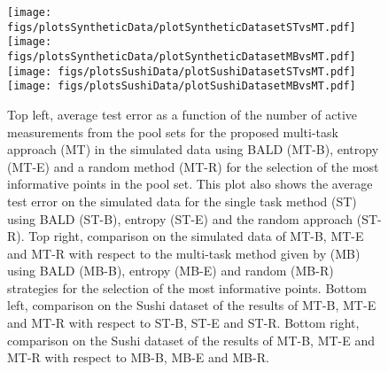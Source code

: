\begin{figure}
\begin{center}
\texttt{[image: figs/plotsSyntheticData/plotSyntheticDatasetSTvsMT.pdf]}
\hspace{0.5cm}
\texttt{[image: figs/plotsSyntheticData/plotSyntheticDatasetMBvsMT.pdf]}\\
\vspace{0.5cm}
\texttt{[image: figs/plotsSushiData/plotSushiDatasetSTvsMT.pdf]}
\hspace{0.5cm}
\texttt{[image: figs/plotsSushiData/plotSushiDatasetMBvsMT.pdf]}
\caption{Top left, average test error as a function of the number of active measurements from the pool sets
for the proposed multi-task approach (MT) in the simulated data using BALD (MT-B), entropy (MT-E) and a random method (MT-R)
for the selection of the most informative points in the pool set. This plot also shows the average test error on the simulated data for
the single task method (ST) using BALD (ST-B), entropy (ST-E) and the random approach (ST-R). Top right,
comparison on the simulated data of MT-B, MT-E and MT-R with respect to the 
multi-task method given by \cite{Birlutiu2011} (MB) using BALD (MB-B), entropy (MB-E) and random (MB-R)
strategies for the selection of the most informative points.
Bottom left, comparison on the Sushi dataset of the results of MT-B, MT-E and MT-R with respect to ST-B, ST-E and ST-R.
Bottom right, comparison on the Sushi dataset of the results of MT-B, MT-E and MT-R with respect to MB-B, MB-E and MB-R.
}\label{fig:resultsSimulatedData}
\end{center}
\end{figure}

